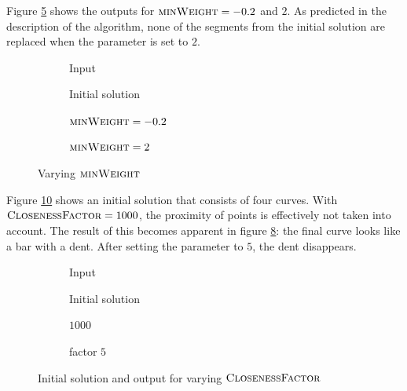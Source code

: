 \documentclass[11pt]{article}
\begin{document}
Figure \ref{fig:exp:multiple_weight} shows the outputs for $\textsc{minWeight} = -0.2$ and $2$. As predicted in the description of the algorithm, none of the segments from the initial solution are replaced when the parameter is set to $2$.
\begingroup
{}%
\begin{figure}[ht!]
\centering
\begin{subfigure}{.25\linewidth}
\centering

\caption{Input}
\label{fig:exp:multiple_weight:input}
\end{subfigure}%
\begin{subfigure}{.25\linewidth}
\centering

\caption{Initial solution}
\label{fig:exp:multiple_weight:initial}
\end{subfigure}%
\begin{subfigure}{.25\linewidth}
\centering

\caption{$\textsc{minWeight} = -0.2$}
\label{fig:exp:multiple_weight:-0.2}
\end{subfigure}%
\begin{subfigure}{.25\linewidth}
\centering

\caption{$\textsc{minWeight} = 2$}
\label{fig:exp:multiple_weight:1}
\end{subfigure}
\caption{Varying $\textsc{minWeight}$}
\label{fig:exp:multiple_weight}
\end{figure}
\endgroup

Figure \ref{fig:exp:multiple_bar} shows an initial solution that consists of four curves.
With $\textsc{ClosenessFactor} = 1000$, the proximity of points is effectively not taken into account. The result of this becomes apparent in figure \ref{fig:exp:multiple_bar:bad}: the final curve looks like a bar with a dent. After setting the parameter to $5$, the dent disappears.

\begingroup
{}%
\begin{figure}[ht!]
\centering
\begin{subfigure}{.25\linewidth}
\centering

\caption{Input}
\label{fig:exp:multiple_bar:input}
\end{subfigure}%
\begin{subfigure}{.25\linewidth}
\centering

\caption{Initial solution}
\label{fig:exp:multiple_bar:initial}
\end{subfigure}%
\begin{subfigure}{.25\linewidth}
\centering

\caption{$1000$}
\label{fig:exp:multiple_bar:bad}
\end{subfigure}%
\begin{subfigure}{.25\linewidth}
\centering

\caption{factor $5$}
\label{fig:exp:multiple_bar:good}
\end{subfigure}
\caption{Initial solution and output for varying $\textsc{ClosenessFactor}$}
\label{fig:exp:multiple_bar}
\end{figure}
\endgroup
\end{document}
